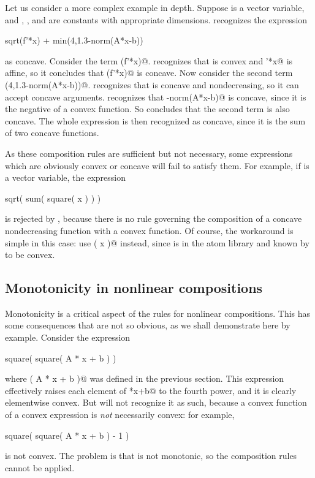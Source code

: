 \documentclass[12pt]{article}
\begin{document}
Let us consider a more complex example in depth. Suppose
\verb@x@ is a vector variable, and
\verb@A@, \verb@b@, and \verb@f@ are 
constants with appropriate dimensions.  \cvx recognizes the
expression
\begin{code}
sqrt(f'*x) + min(4,1.3-norm(A*x-b))
\end{code}
as concave. Consider the term \verb@sqrt(f'*x)@. \cvx
recognizes that \verb@sqrt@ is convex and \verb@f'*x@ is affine,
so it concludes that \verb@sqrt(f'*x)@ is concave. Now consider
the second term \verb@min(4,1.3-norm(A*x-b))@. \cvx
recognizes that \verb@min@ is concave and nondecreasing, so
it can accept concave arguments.
\cvx recognizes that -norm(A*x-b)@ is concave,
since it is the negative of a convex function. So \cvx
concludes that the second term is also concave.
The whole expression is then recognized as concave,
since it is the sum of two concave functions.

As these composition rules are sufficient but not necessary,
some expressions which are obviously convex or concave will fail to
satisfy them. For example, if \verb@x@ is a vector variable, the
expression
\begin{code}
	sqrt( sum( square( x ) ) )
\end{code}
is rejected by \cvx, because there is no rule governing the composition
of a concave nondecreasing function with a convex function.
Of course, the workaround is simple in this case: use \verb@norm( x )@ instead,
since \verb@norm@ is in the atom library and known by \cvx to be convex.

\subsection{Monotonicity in nonlinear compositions}

Monotonicity is a critical aspect of the rules for nonlinear compositions. 
This has some consequences that are not so obvious, as we shall demonstrate here
by example. Consider the expression
\begin{code}
	square( square( A * x + b ) )
\end{code}
where \verb@square( A * x + b )@ was defined in the previous section.
This expression effectively raises each element of \verb@A*x+b@ to the fourth
power, and it is clearly elementwise convex. But
\cvx will not recognize it as such, because a convex function of a convex
expression is \emph{not} necessarily convex: for example,
\begin{code}
	square( square( A * x + b ) - 1 )
\end{code}
is not convex. The problem is that \verb@square@ is not monotonic,
so the composition rules cannot be applied.
\end{document}
